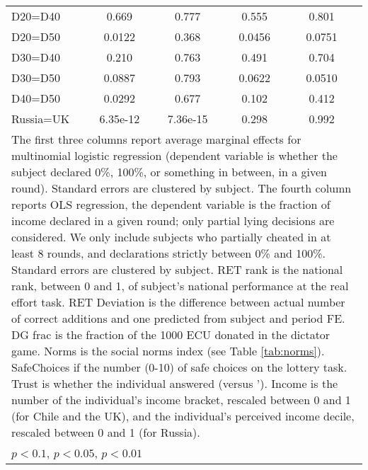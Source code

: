 \begin{tabular}{l|cccccc|cc}
D20=D40         &    0.669         &         &    0.777         &         &    0.555         &         &    0.801         &         \\
D20=D50         &   0.0122         &         &    0.368         &         &   0.0456         &         &   0.0751         &         \\
D30=D40         &    0.210         &         &    0.763         &         &    0.491         &         &    0.704         &         \\
D30=D50         &   0.0887         &         &    0.793         &         &   0.0622         &         &   0.0510         &         \\
D40=D50         &   0.0292         &         &    0.677         &         &    0.102         &         &    0.412         &         \\
Russia=UK       & 6.35e-12         &         & 7.36e-15         &         &    0.298         &         &    0.992         &         \\
\hline\hline
\multicolumn{9}{p{16cm}}{\tiny The first three columns report average marginal effects for multinomial logistic regression (dependent variable is whether the subject declared 0\%, 100\%, or something in between, in a given round). Standard errors are clustered by subject. The fourth column reports OLS regression, the dependent variable is the fraction of income declared in a given round; only partial lying decisions are considered. We only include subjects who partially cheated in at least 8 rounds, and declarations strictly between 0\% and 100\%. Standard errors are clustered by subject. RET rank is the national rank, between 0 and 1, of subject's national performance at the real effort task. RET Deviation is the difference between actual number of correct additions and one predicted from subject and period FE. DG frac is the fraction of the 1000 ECU donated in the dictator game. Norms is the social norms index (see Table \ref{tab:norms}). SafeChoices if the number (0-10) of safe choices on the lottery task. Trust is whether the individual answered  (versus '). Income is the number of the individual's income bracket, rescaled between 0 and 1 (for Chile and the UK), and the individual's perceived income decile, rescaled between 0 and 1 (for Russia).}\\
\multicolumn{9}{l}{\tiny \sym{*} \(p<0.1\), \sym{**} \(p<0.05\), \sym{***} \(p<0.01\)}\\
\end{tabular}